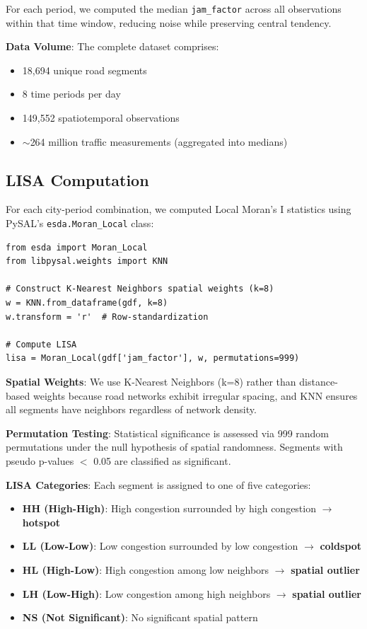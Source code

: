 \documentclass[11pt,a4paper]{article}
\begin{document}
For each period, we computed the median \texttt{jam\_factor} across all observations within that time window, reducing noise while preserving central tendency.

\textbf{Data Volume}: The complete dataset comprises:
\begin{itemize}
    \item 18,694 unique road segments
    \item 8 time periods per day
    \item 149,552 spatiotemporal observations
    \item $\sim$264 million traffic measurements (aggregated into medians)
\end{itemize}

\subsection{LISA Computation}

For each city-period combination, we computed Local Moran's I statistics using PySAL's \texttt{esda.Moran\_Local} class:

\begin{lstlisting}
from esda import Moran_Local
from libpysal.weights import KNN

# Construct K-Nearest Neighbors spatial weights (k=8)
w = KNN.from_dataframe(gdf, k=8)
w.transform = 'r'  # Row-standardization

# Compute LISA
lisa = Moran_Local(gdf['jam_factor'], w, permutations=999)
\end{lstlisting}

\textbf{Spatial Weights}: We use K-Nearest Neighbors (k=8) rather than distance-based weights because road networks exhibit irregular spacing, and KNN ensures all segments have neighbors regardless of network density.

\textbf{Permutation Testing}: Statistical significance is assessed via 999 random permutations under the null hypothesis of spatial randomness. Segments with pseudo p-values $<$ 0.05 are classified as significant.

\textbf{LISA Categories}: Each segment is assigned to one of five categories:

\begin{itemize}
    \item \textbf{HH (High-High)}: High congestion surrounded by high congestion $\rightarrow$ \textbf{hotspot}
    \item \textbf{LL (Low-Low)}: Low congestion surrounded by low congestion $\rightarrow$ \textbf{coldspot}
    \item \textbf{HL (High-Low)}: High congestion among low neighbors $\rightarrow$ \textbf{spatial outlier}
    \item \textbf{LH (Low-High)}: Low congestion among high neighbors $\rightarrow$ \textbf{spatial outlier}
    \item \textbf{NS (Not Significant)}: No significant spatial pattern
\end{itemize}
\end{document}
